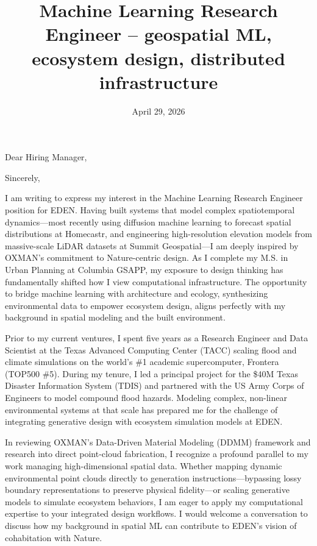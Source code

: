 \documentclass[letterpaper, 10pt,colorlinks,linkcolor=cyan]{moderncv}
\title{\large Machine Learning Research Engineer -- geospatial ML, ecosystem design, distributed infrastructure}
\begin{document}
  \hypersetup{urlcolor=links}

  \date{April 29, 2026}
  \opening{Dear Hiring Manager,}
  \closing{Sincerely,}
  \makelettertitle

I am writing to express my interest in the Machine Learning Research Engineer position for EDEN. Having built systems that model complex spatiotemporal dynamics---most recently using diffusion machine learning to forecast spatial distributions at Homecastr, and engineering high-resolution elevation models from massive-scale LiDAR datasets at Summit Geospatial---I am deeply inspired by OXMAN's commitment to Nature-centric design. As I complete my M.S. in Urban Planning at Columbia GSAPP, my exposure to design thinking has fundamentally shifted how I view computational infrastructure. The opportunity to bridge machine learning with architecture and ecology, synthesizing environmental data to empower ecosystem design, aligns perfectly with my background in spatial modeling and the built environment.

Prior to my current ventures, I spent five years as a Research Engineer and Data Scientist at the Texas Advanced Computing Center (TACC) scaling flood and climate simulations on the world's \#1 academic supercomputer, Frontera (TOP500 \#5). During my tenure, I led a principal project for the \$40M Texas Disaster Information System (TDIS) and partnered with the US Army Corps of Engineers to model compound flood hazards. Modeling complex, non-linear environmental systems at that scale has prepared me for the challenge of integrating generative design with ecosystem simulation models at EDEN.

In reviewing OXMAN's Data-Driven Material Modeling (DDMM) framework and research into direct point-cloud fabrication, I recognize a profound parallel to my work managing high-dimensional spatial data. Whether mapping dynamic environmental point clouds directly to generation instructions---bypassing lossy boundary representations to preserve physical fidelity---or scaling generative models to simulate ecosystem behaviors, I am eager to apply my computational expertise to your integrated design workflows. I would welcome a conversation to discuss how my background in spatial ML can contribute to EDEN's vision of cohabitation with Nature.

  \makeletterclosing
  \clearpage
\end{document}
